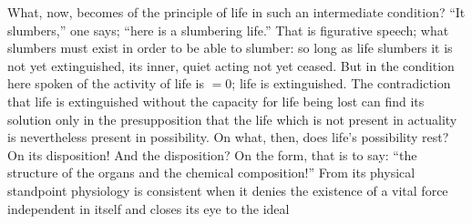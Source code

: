 \documentclass[12pt,a4paper]{book}
\begin{document}
What, now, becomes of the principle of life in such an intermediate condition?
``It slumbers,'' one says; ``here is a slumbering life.'' That is figurative
speech; what slumbers must exist in order to be able to slumber: so long as
life slumbers it is not yet extinguished, its inner, quiet acting not yet
ceased. But in
\setcounter{footnote}{0}
the condition here spoken of the activity of life is $= 0$; life is
extinguished. The contradiction that life is extinguished without the capacity
for life being lost can find its solution only in the presupposition that the
life which is not present in actuality is nevertheless present in possibility.
On what, then, does life's possibility rest? On its disposition! And the
disposition? On the form, that is to say: ``the structure of the organs and the
chemical composition!'' From its physical standpoint physiology is consistent
when it denies the existence of a vital force independent in itself and closes
its eye to the ideal
\end{document}
